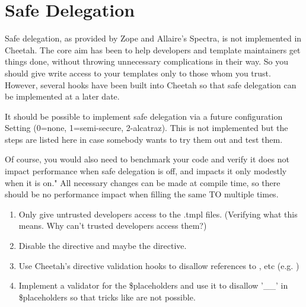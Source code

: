 \section{Safe Delegation}
\label{safeDelegation}


Safe delegation, as provided by Zope and Allaire's Spectra, is not implemented
in Cheetah.  The core aim has been to help developers and template maintainers
get things done, without throwing unnecessary complications in their
way.  So you should give write access to your templates only to those whom you
trust.  However, several hooks have been built into Cheetah so that safe
delegation can be implemented at a later date.  

It should be possible to implement safe delegation via a future configuration
Setting  (0=none, 1=semi-secure, 2-alcatraz).  This
is not implemented but the steps are listed here in case somebody wants to try
them out and test them.  

Of course, you would also need to benchmark your code
and verify it does not impact performance when safe delegation is off, and 
impacts it only modestly when it is on."  All necessary changes can be made
at compile time, so there should be no performance impact when filling the
same TO multiple times.

\begin{enumerate}

\item  Only give untrusted developers access to the .tmpl files.
(Verifying what this means.  Why can't trusted developers access them?)

\item  Disable the  directive and maybe the  directive.

\item  Use Cheetah's directive validation hooks to disallow
references to , etc
(e.g.  )

\item  Implement a validator for the \$placeholders and use it
to disallow '\_\_'  in \$placeholders so that tricks like
 are not possible.

\end{enumerate}


